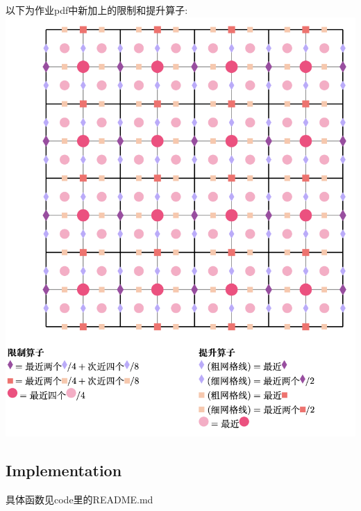 \documentclass{article}
\begin{document}
以下为作业pdf中新加上的限制和提升算子:\\
\includegraphics[scale=0.5]{image/updownpdf.png}\\
\subsection{Implementation}
具体函数见code里的README.md\\
\end{document}
